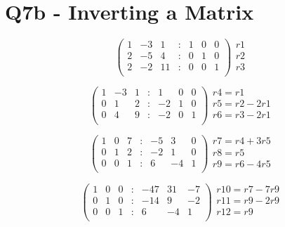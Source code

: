 \documentclass[12pt, a4paper]{report}
\theoremstyle{plain}
\theoremstyle{definition}
\theoremstyle{remark}
\begin{document}
{{\section*{Q7b - Inverting a Matrix}
\[\left(\begin{array}{ccccccc}
1	&	-3	&	1	&	:	&	1	&	0	&	0	\\
2	&	-5	&	4	&	:	&	0	&	1	&	0	\\
2	&	-2	&	11	&	:	&	0	&	0	&	1	\\
\end{array}\right)
	\begin{array}{c}
  r1	\\
			r2	\\
			r3	\\
 \end{array}\]
		
\bigskip														

\[\left(\begin{array}{ccccccc}
1	&	-3	&	1	&	:	&	1	&	0	&	0	\\
0	&	1	&	2	&	:	&	-2	&	1	&	0	\\
0	&	4	&	9	&	:	&	-2	&	0	&	1	\\
\end{array}\right)
	\begin{array}{c}
r4=r1	\\
r5=r2-2r1	\\
r6=r3-2r1	\\
 \end{array}\]		
\bigskip														
	
\[\left(\begin{array}{ccccccc}
1	&	0	&	7	&	:	&	-5	&	3	&	0	\\
0	&	1	&	2	&	:	&	-2	&	1	&	0	\\
0	&	0	&	1	&	:	&	6	&	-4	&	1	\\
\end{array}\right)
\begin{array}{c}
r7=r4+3r5	\\
r8=r5	\\
r9=r6-4r5	\\
\end{array}\]	
\bigskip														
																
\[\left(\begin{array}{ccccccc}
1	&	0	&	0	&	:	&	-47	&	31	&	-7	\\
0	&	1	&	0	&	:	&	-14	&	9	&	-2	\\
0	&	0	&	1	&	:	&	6	&	-4	&	1	\\
\end{array}\right)
\begin{array}{c}
r10=r7-7r9	\\
r11=r9-2r9	\\
r12=r9	\\
\end{array}\]	
																	
}}
\end{document}
